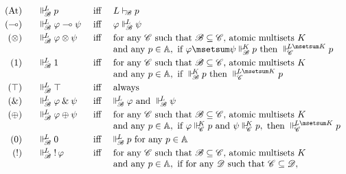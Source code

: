 \documentclass{beamer}
\begin{document}
\begin{frame}%
	\noindent\begin{minipage}{0.47\textwidth}\scriptsize
		\begin{figure}[t]
			\[
				\begin{array}{r@{\qquad}l@{\quad}c@{\quad}l}
					\mbox{(At)} & \suppM{\baseB}{L} p  & \text{ iff } &   L\deriveBaseM{\baseB} p  \\ [1mm]
					(\mto) & \suppM{\baseB}{L} \varphi \mto \psi & \text{ iff } & \varphi \suppM{\baseB}{L} \psi \\[1mm]
					(\mand) & \suppM{\baseB}{L} \varphi \mand \psi   & \text{ iff } &  \text{for any } \baseC  \text{ such that } \baseB \baseLeq \baseC \text{, atomic multisets } K \\ 
					& & & \text{and any } p \in \At, \text{ if } \varphi\msetsum\psi\suppM{\baseB}{K}p \text{ then } \suppM{\baseC}{L\msetsum K} p  \\[1mm]
					(\mtop) & \suppM{\baseB}{L} \mtop   & \text{ iff } &  \text{for any } \baseC  \text{ such that } \baseB \baseLeq \baseC \text{, atomic multisets } K \\ 
					& & & \text{and any } p \in \At, \text{ if } \suppM{\baseB}{K}p \text{ then } \suppM{\baseC}{L\msetsum K} p  \\[1mm]
					(\top) & \suppM{\baseB}{L} \top & \text{ iff } & \text{always} \\[1mm] 
					(\aand) & \suppM{\baseB}{L} \varphi \aand \psi   & \text{ iff } &   \suppM{\baseB}{L} \varphi \text{ and }   \suppM{\baseB}{L} \psi  \\[1mm] 
					(\aor) & \suppM{\baseB}{L} \varphi \aor \psi & \text{ iff } &  \text{for any } \baseC  \text{ such that } \baseB \baseLeq \baseC \text{, atomic multisets } K \\ 
					& & & \text{and any } p \in \At, \text{ if } \varphi \suppM{\baseC}{K} p \text{ and } \psi \suppM{\baseC}{K} p, \text{ then } \suppM{\baseC}{L\msetsum K} p  \\[1mm]
					(\abot) & \suppM{\baseB}{L} \abot & \text{iff} &    \suppM{\baseB}{L} p \text{ for any } p \in \At \\[1mm]
					(\bang) & \suppM{\baseB}{L} \bang \varphi & \text{iff} &  \text{for any } \baseC  \text{ such that } \baseB \baseLeq \baseC \text{, atomic multisets } K \\ 
					& & & \text{and any } p \in \At, \text{ if for any } \baseD \text{ such that } \baseC\baseLeq\baseD, \\

\end{array}\]
\end{figure}
\end{minipage}
\end{frame}
\end{document}

